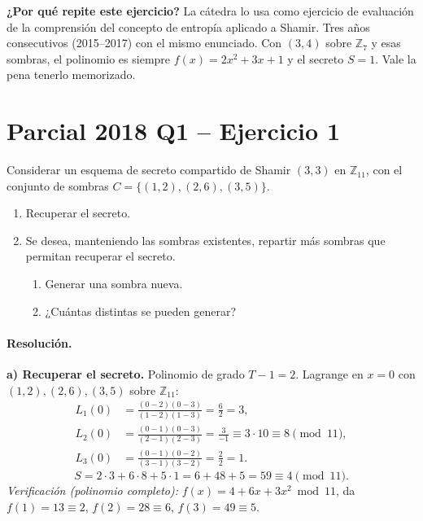 \documentclass[11pt,a4paper]{article}
\begin{document}
\begin{tipsbox}
\textbf{¿Por qué repite este ejercicio?} La cátedra lo usa como ejercicio de evaluación de la comprensión del concepto de entropía aplicado a Shamir. Tres años consecutivos (2015--2017) con el mismo enunciado. Con $(3,4)$ sobre $\mathbb{Z}_7$ y esas sombras, el polinomio es siempre $f(x)=2x^2+3x+1$ y el secreto $S=1$. Vale la pena tenerlo memorizado.
\end{tipsbox}

\section{Parcial 2018 Q1 -- Ejercicio 1}
\label{sec:2018}

\begin{consignabox}
Considerar un esquema de secreto compartido de Shamir $(3,3)$ en $\mathbb{Z}_{11}$, con el conjunto de sombras $C = \{(1,2),(2,6),(3,5)\}$.
\begin{enumerate}[label=\alph*)]
  \item Recuperar el secreto.
  \item Se desea, manteniendo las sombras existentes, repartir más sombras que permitan recuperar el secreto.
  \begin{enumerate}[label=\roman*.]
    \item Generar una sombra nueva.
    \item ¿Cuántas distintas se pueden generar?
  \end{enumerate}
\end{enumerate}
\end{consignabox}

\paragraph{Resolución.}
\textbf{a) Recuperar el secreto.} Polinomio de grado $T-1=2$. Lagrange en $x=0$ con $(1,2),(2,6),(3,5)$ sobre $\mathbb{Z}_{11}$:
\begin{align*}
  L_1(0) &= \frac{(0-2)(0-3)}{(1-2)(1-3)} = \frac{6}{2} = 3, \\
  L_2(0) &= \frac{(0-1)(0-3)}{(2-1)(2-3)} = \frac{3}{-1} \equiv 3\cdot 10 \equiv 8 \pmod{11}, \\
  L_3(0) &= \frac{(0-1)(0-2)}{(3-1)(3-2)} = \frac{2}{2} = 1.
\end{align*}
\[
  S = 2\cdot 3 + 6\cdot 8 + 5\cdot 1 = 6 + 48 + 5 = 59 \equiv \boxed{4} \pmod{11}.
\]
\emph{Verificación (polinomio completo):} $f(x)=4+6x+3x^2 \bmod 11$, da $f(1)=13\equiv2$, $f(2)=28\equiv6$, $f(3)=49\equiv5$. \checkmark
\end{document}
